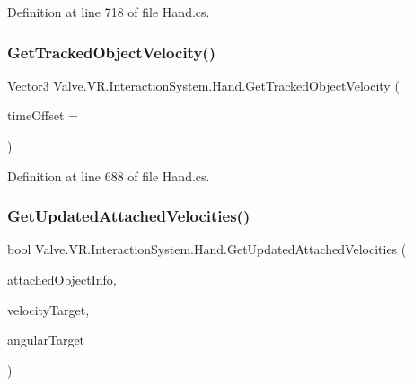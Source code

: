 Definition at line 718 of file Hand.\+cs.

\mbox{\label{class_valve_1_1_v_r_1_1_interaction_system_1_1_hand_a128de24fb785ca4bfdb3e5516e20573e}} 
\subsubsection{\texorpdfstring{GetTrackedObjectVelocity()}{GetTrackedObjectVelocity()}}
{\footnotesize\ttfamily Vector3 Valve.\+V\+R.\+Interaction\+System.\+Hand.\+Get\+Tracked\+Object\+Velocity (\begin{DoxyParamCaption}\item[{float}]{time\+Offset = {} }\end{DoxyParamCaption})}



Definition at line 688 of file Hand.\+cs.

\mbox{\label{class_valve_1_1_v_r_1_1_interaction_system_1_1_hand_ab81ca68cad92354d9b14d2f534ac1b94}} 
\subsubsection{\texorpdfstring{GetUpdatedAttachedVelocities()}{GetUpdatedAttachedVelocities()}}
{\footnotesize\ttfamily bool Valve.\+V\+R.\+Interaction\+System.\+Hand.\+Get\+Updated\+Attached\+Velocities (\begin{DoxyParamCaption}\item[{\mbox{\hyperlink{struct_valve_1_1_v_r_1_1_interaction_system_1_1_hand_1_1_attached_object}{Attached\+Object}}}]{attached\+Object\+Info,  }\item[{out Vector3}]{velocity\+Target,  }\item[{out Vector3}]{angular\+Target }\end{DoxyParamCaption})\hspace{0.3cm}{\ttfamily [protected]}}



